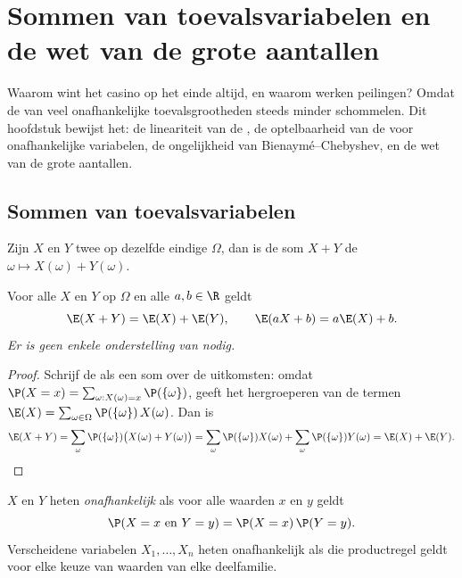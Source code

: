 \chapter{Sommen van toevalsvariabelen en de wet van de grote aantallen}\label{ch:g12:sums}

Waarom wint het casino op het einde altijd, en waarom werken peilingen? Omdat
de  van veel onafhankelijke toevalsgrootheden steeds minder
schommelen. Dit hoofdstuk bewijst het: de lineariteit van de
, de optelbaarheid van de  voor onafhankelijke
variabelen, de ongelijkheid van Bienaymé--Chebyshev, en de wet van de grote
aantallen.

\section{Sommen van toevalsvariabelen}

Zijn $X$ en $Y$ twee  op dezelfde eindige
 $\Omega$, dan is de som $X + Y$ de 
$\omega \mapsto X(\omega) + Y(\omega)$.

\begin{theorem}\label{thm:g12:sums:linearity}
Voor alle  $X$ en $Y$ op $\Omega$ en alle $a, b \in \R$
geldt
\[
\E(X + Y) = \E(X) + \E(Y), \qquad \E(aX + b) = a\E(X) + b .
\]
\emph{Er is geen enkele onderstelling van  nodig.}
\end{theorem}

\begin{proof}
Schrijf de  als een som over de uitkomsten: omdat
$\P(X = x) = \sum_{\omega : X(\omega) = x} \P(\{\omega\})$, geeft het
hergroeperen van de termen
$\E(X) = \sum_{\omega \in \Omega} \P(\{\omega\})\,X(\omega)$. Dan is
\[
\E(X + Y) = \sum_{\omega} \P(\{\omega\})\bigl(X(\omega) + Y(\omega)\bigr)
= \sum_{\omega} \P(\{\omega\})X(\omega)
+ \sum_{\omega} \P(\{\omega\})Y(\omega) = \E(X) + \E(Y). \qedhere
\]
\end{proof}

\begin{definition}\label{def:g12:sums:indep}
$X$ en $Y$ heten \emph{onafhankelijk}
als voor alle waarden $x$ en $y$ geldt
\[
\P(X = x \text{ en } Y = y) = \P(X = x)\,\P(Y = y).
\]
Verscheidene variabelen $X_1, \dots, X_n$ heten onafhankelijk als die
productregel geldt voor elke keuze van waarden van elke deelfamilie.
\end{definition}

